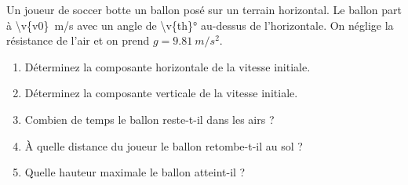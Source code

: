 Un joueur de soccer botte un ballon posé sur un terrain horizontal. Le ballon part à \qty{\v{v0}}{m/s} avec un angle de \ang{\v{th}} au-dessus de l'horizontale. On néglige la résistance de l'air et on prend $g = \qty{9.81}{m/s^2}$.

\begin{enumerate}[label=\alph*)]
    \item Déterminez la composante horizontale de la vitesse initiale.
    \item Déterminez la composante verticale de la vitesse initiale.
    \item Combien de temps le ballon reste-t-il dans les airs ?
    \item À quelle distance du joueur le ballon retombe-t-il au sol ?
    \item Quelle hauteur maximale le ballon atteint-il ?
\end{enumerate}

